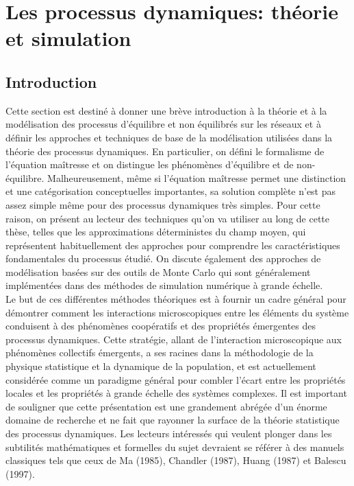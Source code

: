 \section{Les processus dynamiques: théorie et simulation}

\subsection{Introduction}

Cette section est destiné à  donner une brève introduction à la théorie et à la modélisation des processus d'équilibre et non équilibrés sur les réseaux et à définir les approches et techniques de base de la modélisation utilisées dans la théorie des processus dynamiques. En particulier, on défini le formalisme de l'équation maîtresse et on distingue les phénomènes d'équilibre et de non-équilibre. Malheureusement, même si l'équation maîtresse permet une distinction et une catégorisation conceptuelles importantes, sa solution complète n'est pas assez simple même pour des processus dynamiques très simples. Pour cette raison, on présent au lecteur des techniques qu'on va utiliser au long de cette thèse, telles que les approximations déterministes du champ moyen, qui représentent habituellement des approches pour comprendre les caractéristiques fondamentales du processus étudié. On discute également des approches de modélisation basées sur des outils de Monte Carlo qui sont généralement implémentées dans des méthodes de simulation numérique à grande échelle.\\ 

Le but de ces différentes méthodes théoriques est à fournir un cadre général pour démontrer comment les interactions microscopiques entre les éléments du système conduisent à des phénomènes coopératifs et des propriétés émergentes des processus dynamiques. Cette stratégie, allant de l'interaction microscopique aux phénomènes collectifs émergents, a ses racines dans la méthodologie de la physique statistique et la dynamique de la population, et est actuellement considérée comme un paradigme général pour combler l'écart entre les propriétés locales et les propriétés à grande échelle des systèmes complexes. Il est important de souligner que cette présentation est une grandement abrégée d'un énorme domaine de recherche et ne fait que rayonner la surface de la théorie statistique des processus dynamiques. Les lecteurs intéressés qui veulent plonger dans les subtilités mathématiques et formelles du sujet devraient se référer à des manuels classiques tels que ceux de Ma (1985), Chandler (1987), Huang (1987) et Balescu (1997).
